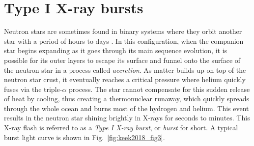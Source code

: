 \documentclass[../main.tex]{subfiles}
\begin{document}
 
 
 
\section{Type I X-ray bursts}\label{section:type_I_xray_bursts}
Neutron stars are sometimes found in binary systems where they orbit another star with a period of hours to days \citep{Lewin1993}. In this configuration, when the companion star begins expanding as it goes through its main sequence evolution, it is possible for its outer layers to escape its surface and funnel onto the surface of the neutron star in a process called \textit{accretion}.  As matter builds up on top of the neutron star crust, it eventually reaches a critical pressure where helium quickly fuses via the triple-$\alpha$ process.  The star cannot compensate for this sudden release of heat by cooling, thus creating a thermonuclear runaway, which quickly spreads through the whole ocean and burns most of the hydrogen and helium. This event results in the neutron star shining brightly in X-rays for seconds to minutes. This X-ray flash is referred to as a \textit{Type I X-ray burst}, or \textit{burst} for short. A typical burst light curve is shown in Fig.~\ref{fig:keek2018_fig3}. 
\end{document}
